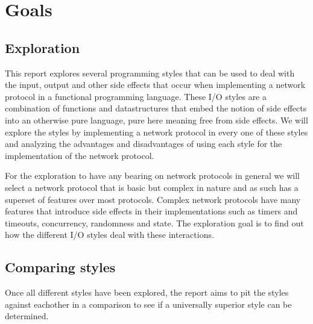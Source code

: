 \chapter{Goals}
\section{Exploration}
This report explores several programming styles that can be used to deal with the input, output and other side effects that occur when implementing a network protocol in a functional programming language.
These I/O styles are a combination of functions and datastructures that embed the notion of side effects into an otherwise pure language, pure here meaning free from side effects.
We will explore the styles by implementing a network protocol in every one of these styles and analyzing the advantages and disadvantages of using each style for the implementation of the network protocol.

For the exploration to have any bearing on network protocols in general we will select a network protocol that is basic but complex in nature and as such has a superset of features over most protocols. 
Complex network protocols have many features that introduce side effects in their implementations such as timers and timeouts, concurrency, randomness and state.
The exploration goal is to find out how the different I/O styles deal with these interactions.

\section{Comparing styles}
Once all different styles have been explored, the report aims to pit the styles against eachother in a comparison to see if a universally superior style can be determined.
